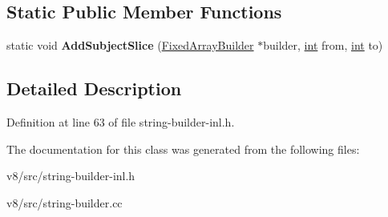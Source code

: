 \subsection*{Static Public Member Functions}
\begin{DoxyCompactItemize}
\item 
\mbox{\label{classv8_1_1internal_1_1ReplacementStringBuilder_aba524477fe28f1c8ae3f7c9f2d969208}} 
static void {\bfseries Add\+Subject\+Slice} (\mbox{\hyperlink{classv8_1_1internal_1_1FixedArrayBuilder}{Fixed\+Array\+Builder}} $\ast$builder, \mbox{\hyperlink{classint}{int}} from, \mbox{\hyperlink{classint}{int}} to)
\end{DoxyCompactItemize}


\subsection{Detailed Description}


Definition at line 63 of file string-\/builder-\/inl.\+h.



The documentation for this class was generated from the following files\+:\begin{DoxyCompactItemize}
\item 
v8/src/string-\/builder-\/inl.\+h\item 
v8/src/string-\/builder.\+cc\end{DoxyCompactItemize}
